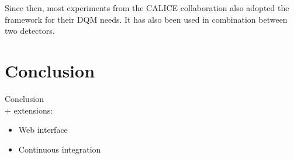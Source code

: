 \documentclass{webofc}
\begin{document}
Since then, most experiments from the CALICE collaboration also adopted the framework for their DQM needs. It has also been used in combination between two detectors.

\section{Conclusion}
\label{sec:conclusion}

Conclusion \\
+ extensions:

\begin{itemize}
  \item Web interface
  \item Continuous integration
\end{itemize}


\end{document}
